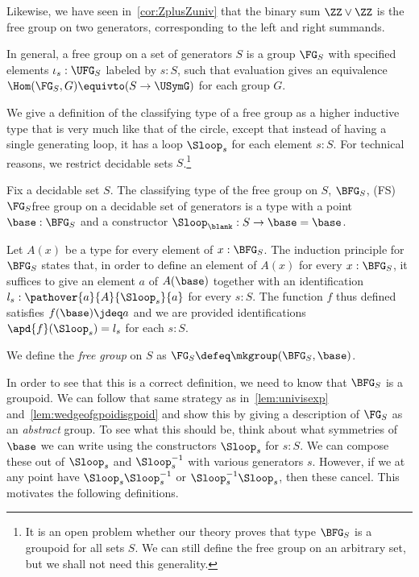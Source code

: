Likewise, we have seen in~\cref{cor:ZplusZuniv} that the binary sum $\ZZ \vee \ZZ$
is the free group on two generators, corresponding to the left and right summands.

In general, a free group on a set of generators $S$ is a group $\FG_S$ with
specified elements $\iota_s:\UFG_S$ labeled by $s:S$,
such that evaluation gives an equivalence $\Hom(\FG_S,G) \equivto (S \to \USymG)$
for each group $G$.

We give a definition of the classifying type of a free group
as a higher inductive type that is very much like that of the circle,
except that instead of having a single generating loop,
it has a loop $\Sloop_s$ for each element $s:S$.
For technical reasons, we restrict decidable sets $S$.\footnote{%
  It is an open problem whether our theory proves that type $\BFG_S$
  is a groupoid for all sets $S$.
  We can still define the free group on an arbitrary set,
  but we shall not need this generality.}
\begin{definition}
  \label{def:bfree}
  Fix a decidable set $S$.
  The classifying type of the free group on $S$, $\BFG_S$,%
  \glossary(FS){$\protect\FG_S$}{free group on a decidable set of generators}
  is a type with a point $\base : \BFG_S$ and
  a constructor ${\Sloop_\blank} : S \to \base=\base$.

  Let $A(x)$ be a type for every element of $x:\BFG_S$.
  The induction principle for $\BFG_S$ states that,
  in order to define an element of $A(x)$ for every $x:\BFG_S$,
  it suffices to give an element $a$ of $A(\base)$ together
  with an identification $l_s:\pathover{a}{A}{\Sloop_s}{a}$
  for every $s:S$.
  The function $f$ thus defined satisfies $f(\base)\jdeq a$
  and we are provided identifications $\apd{f}(\Sloop_s)=l_s$ for each $s:S$.

  We define the \emph{free group} on $S$ as $\FG_S \defeq \mkgroup(\BFG_S,\base)$.
\end{definition}

In order to see that this is a correct definition,
we need to know that $\BFG_S$ is a groupoid.
We can follow that same strategy as in~\cref{lem:univisexp}
and~\cref{lem:wedgeofgpoidisgpoid}
and show this by giving a description of $\FG_S$ as an \emph{abstract} group.
To see what this should be, think about what symmetries of $\base$
we can write using the constructors $\Sloop_s$ for $s:S$.
We can compose these out of $\Sloop_s$ and $\Sloop_s^{-1}$
with various generators $s$.
However, if we at any point have $\Sloop_s\Sloop_s^{-1}$ or $\Sloop_s^{-1}\Sloop_s$,
then these cancel.
This motivates the following definitions.

